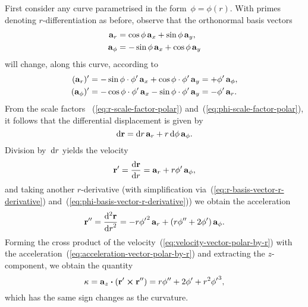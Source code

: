First consider any curve parametrised in the form~$\phi = \phi (r)$.
With primes denoting $r$-differentiation as before,
observe that the orthonormal basis vectors
\begin{align}
  \mathop{}\!\boldsymbol{\mathbf{a}}_{r} &= \cos\phi \mathop{}\!\boldsymbol{\mathbf{a}}_{x} + \sin\phi \mathop{}\!\boldsymbol{\mathbf{a}}_{y},
    \label{eq:r-basis-vector} \\
  \mathop{}\!\boldsymbol{\mathbf{a}}_{\phi} &= -\sin\phi \mathop{}\!\boldsymbol{\mathbf{a}}_{x} + \cos\phi \mathop{}\!\boldsymbol{\mathbf{a}}_{y}
    \label{eq:phi-basis-vector}
\end{align}
will change, along this curve, according to
\begin{align}
  (\basisvec{r})'
  &= -\sin\phi \cdot \phi' \basisvec{x} + \cos\phi \cdot \phi' \basisvec{y}
  = +\phi' \basisvec{\phi},
    \label{eq:r-basis-vector-r-derivative} \\
  (\basisvec{\phi})'
  &= -\cos\phi \cdot \phi' \basisvec{x} - \sin\phi \cdot \phi' \basisvec{y}
  = -\phi' \basisvec{r}.
    \label{eq:phi-basis-vector-r-derivative}
\end{align}
From the scale factors~%
  (\ref{eq:r-scale-factor-polar}) and~(\ref{eq:phi-scale-factor-polar}),
it follows that the differential displacement is given by
\begin{equation}
  \mathop{}\!\mathrm{d}\boldsymbol{\mathbf{r}} = \mathop{}\!\mathrm{d} r \mathop{}\!\boldsymbol{\mathbf{a}}_{r} + r \mathop{}\!\mathrm{d}\phi \mathop{}\!\boldsymbol{\mathbf{a}}_{\phi}.
  \label{eq:differential-displacement-polar}
\end{equation}
Division by~$\mathop{}\!\mathrm{d} r$ yields the velocity
\begin{equation}
  \positionvec' = \tder{\positionvec}{r} =
  \basisvec{r} + r \phi' \basisvec{\phi},
  \label{eq:velocity-vector-polar-by-r}
\end{equation}
and taking another $r$-derivative
(with simplification via~(\ref{eq:r-basis-vector-r-derivative})
and~(\ref{eq:phi-basis-vector-r-derivative}))
we obtain the acceleration
\begin{equation}
  \positionvec'' = \tder[2]{\positionvec}{r} =
  -r {\phi'}^2 \basisvec{r}
    +
  \roundbr*{r \phi'' + 2 \phi'} \basisvec{\phi}.
  \label{eq:acceleration-vector-polar-by-r}
\end{equation}
Forming the cross product of
the velocity~(\ref{eq:velocity-vector-polar-by-r})
with the acceleration~(\ref{eq:acceleration-vector-polar-by-r})
and extracting the $z$-component,
we obtain the quantity
\begin{equation}
  \kappa =
  \mathop{}\!\boldsymbol{\mathbf{a}}_{z} \boldsymbol{\cdot} (\boldsymbol{\mathbf{r}}' \boldsymbol{\times} \boldsymbol{\mathbf{r}}'') =
  r \phi'' + 2 \phi' + r^2 {\phi'}^3,
  \label{eq:kappa-polar-by-r}
\end{equation}
which has the same sign changes as the curvature.

